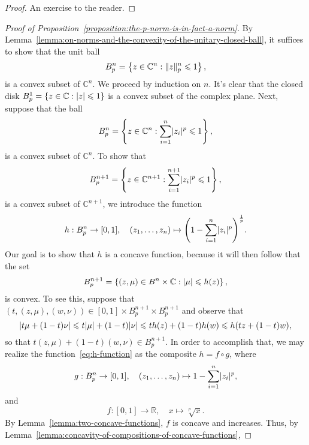 \begin{proof}
  An exercise to the reader.
\end{proof}

\begin{proof}[Proof of Proposition~\ref{proposition:the-p-norm-is-in-fact-a-norm}]
  By Lemma~\ref{lemma:on-norms-and-the-convexity-of-the-unitary-closed-ball},
  it suffices to show that the unit ball
  \[
    B^{n}_{p}
    =
    \left\{z\in\mathbb{C}^{n}:\lVert z\rVert^{n}_{p}\leqslant{1}\right\},
  \]
  is a convex subset of \(\mathbb{C}^{n}\). We proceed by induction on
  \(n\). It's clear that the closed disk
  \(B^{1}_{p}=\left\{z\in\mathbb{C}:\lvert z\rvert\leqslant{1}\right\}\) is a
  convex subset of the complex plane. Next, suppose that the ball
  \[
    B^{n}_{p}
    =
    \left\{z\in\mathbb{C}^{n}:\sum_{i=1}^{n}\lvert z_{i}\rvert^{p}\leqslant{1}\right\},
  \]
  is a convex subset of \(\mathbb{C}^{n}\). To show that
  \[
    B^{n+1}_{p}
    =
    \left\{z\in\mathbb{C}^{n+1}:\sum_{i=1}^{n+1}\lvert z_{i}\rvert^{p}\leqslant{1}\right\},
  \]
  is a convex subset of \(\mathbb{C}^{n+1}\), we introduce the function
  \begin{equation}\label{eq:h-function}
    h:B^{n}_{p}\to{[0,1]},
    \quad{(z_{1},\ldots,z_{n})\mapsto\left(1-\sum_{i=1}^{n}\lvert z_{i}\rvert^{p}\right)^{\frac{1}{p}}}.
  \end{equation}
  Our goal is to show that \(h\) is a concave function, because it will then follow that
  the set
  \[
    B^{n+1}_{p}
    =
    \left\{(z,\mu)\in{B^{n}\times\mathbb{C}}:\lvert\mu\rvert\leqslant{h(z)}\right\},
  \]
  is convex. To see this, suppose that
  \((t,(z,\mu),(w,\nu))\in{[0,1]\times{B^{n+1}_{p}}\times{B^{n+1}_{p}}}\) and
  observe that
  \[
    \lvert t\mu+(1-t)\nu\rvert
    \leqslant{t\lvert\mu\rvert+(1-t)\lvert\nu\rvert}
    \leqslant{th(z)+(1-t)h(w)}
    \leqslant{h(tz+(1-t)w}),
  \]
  so that \(t(z,\mu)+(1-t)(w,\nu)\in{B^{n+1}_{p}}\). In order to accomplish
  that, we may realize the function~\eqref{eq:h-function} as the composite
  \(h=f\circ{g}\), where
  \begin{equation}\label{eq:g-function}
    g:B^{n}_{p}\to[0,1],
    \quad{(z_{1},\ldots,z_{n})\mapsto{1-\sum_{i=1}^{n}\lvert z_{i}\rvert^{p}}},
  \end{equation}
  and
  \begin{equation}\label{eq:f-function}
    f:[0,1]\to\mathbb{R},\quad{x\mapsto{\sqrt[p]{x}}}.
  \end{equation}
  By Lemma~\ref{lemma:two-concave-functions}, \(f\) is concave and increases.
  Thus, by Lemma~\ref{lemma:concavity-of-compositions-of-concave-functions},

\end{proof}
